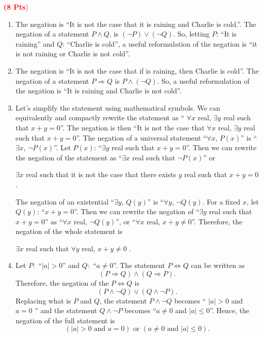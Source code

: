 \documentclass[12pt]{article}
\newcommand{\exo}[3]{\noindent\textcolor{red}{\fbox{\textbf{Appendix {#1}, Problem {#2}}}\hrulefill   \textbf{({#3} Pts})}\vspace*{10pt}}
\begin{document}
 	\exo{L}{3}{8}
 	\begin{enumerate}[label=\alph*)]
 	\item The negation is ``It is not the case that it is raining and Charlie is cold.''. The negation of a statement $P \wedge Q$, is $(\neg P) \vee (\neg Q)$. So, letting $P$: ``It is raining'' and $Q$: ``Charlie is cold'', a useful reformulation of the negation is ``it is not raining or Charlie is not cold''.
 	\item The negation is ``It is not the case that if is raining, then Charlie is cold''. The negation of a statement $P \Rightarrow Q$ is $P \wedge (\neg Q)$. So, a useful reformulation of the negation is ``It is raining and Charlie is not cold''.
 	\item Let's simplify the statement using mathematical symbols. We can equivalently and compactly rewrite the statement as `` $\forall x$ real, $\exists y$ real such that $x + y = 0$''. The negation is then ``It is not the case that $\forall x$ real, $\exists y$ real such that $x + y = 0$''. The negation of a universal statement ``$\forall x$, $P (x)$'' is ``$\exists x$, $\neg P(x)$''. Let $P (x)$: ``$\exists y$ real such that $x + y = 0$''. Then we can rewrite the negation of the statement as ``$\exists x$ real such that $\neg P (x)$'' or
 		\begin{center}
 		$\exists x$ real such that it is not the case that there exists $y$ real such that $x + y = 0$.
 		\end{center}
 	The negation of an existential ``$\exists y$, $Q(y)$'' is ``$\forall y$, $\neg Q(y)$. For a fixed $x$, let $Q (y)$: ``$x + y = 0$''. Then we can rewrite the negation of ``$\exists y$ real such that $x + y = 0$'' as ``$\forall x$ real, $\neg Q (y)$'', or ``$\forall x$ real, $x + y \neq 0$''. Therefore, the negation of the whole statement is
 		\begin{center}
 		$\exists x$ real such that $\forall y$ real, $x + y \neq 0$ .
 		\end{center}
 	\item Let $P:$ ``$|a| > 0$'' and $Q:$ ``$a \neq 0$''. The statement $P \iff Q$ can be written as
 		\[
 			(P \Rightarrow Q ) \wedge (Q \Rightarrow P) .
 		\]
 	Therefore, the negation of the $P \iff Q$ is
 		\[
 			(P \wedge \neg Q) \vee (Q \wedge \neg P) .
 		\]
 	Replacing what is $P$ and $Q$, the statement $P \wedge \neg Q$ becomes `` $|a| > 0$ and $a = 0$ '' and the statement $Q \wedge \neg P$ becomes ``$a \neq 0$ and $|a| \leq 0$''. Hence, the negation of the full statement is
 		\[
 			( |a| > 0 \text{ and } a = 0 ) \text{ or } (a \neq 0 \text{ and } |a| \leq 0 ) .
 		\]
	\end{enumerate}
\end{document}
